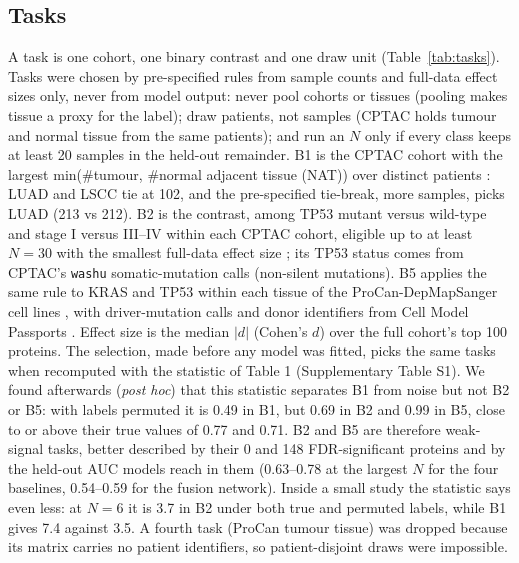 \documentclass[10pt,letterpaper]{article}
\begin{document}
\subsection{Tasks}\label{sec:tasks}
A task is one cohort, one binary contrast and one draw unit (Table~\ref{tab:tasks}). Tasks were chosen by
pre-specified rules from sample counts and full-data effect sizes only, never from model output: never pool
cohorts or tissues (pooling makes tissue a proxy for the label); draw patients, not samples (CPTAC holds
tumour and normal tissue from the same patients); and run an $N$ only if every class keeps at least 20
samples in the held-out remainder. B1 is the CPTAC cohort with the largest min(\#tumour, \#normal adjacent
tissue (NAT)) over distinct patients \citep{gillette2020luad,lindgren2021cptac}: LUAD and LSCC tie at 102, and
the pre-specified tie-break, more samples, picks LUAD (213 vs 212). B2 is the contrast, among TP53 mutant
versus wild-type and stage I versus III--IV within each CPTAC cohort, eligible up to at least $N = 30$ with the
smallest full-data effect size \citep{cao2021pdac}; its TP53 status comes from CPTAC's \texttt{washu}
somatic-mutation calls (non-silent mutations). B5 applies the same rule to KRAS and TP53 within each tissue of
the ProCan-DepMapSanger cell lines \citep{goncalves2022procan}, with driver-mutation calls and donor
identifiers from Cell Model Passports \citep{vandermeer2019cmp}. Effect size is the median $|d|$ (Cohen's $d$)
over the full cohort's top 100 proteins. The selection, made before any model was fitted, picks the same tasks when recomputed with the statistic of Table 1 (Supplementary Table S1). We found afterwards (\emph{post hoc}) that this
statistic separates B1 from noise but not B2 or B5: with labels permuted it is 0.49 in B1, but 0.69 in B2
and 0.99 in B5, close to or above their true values of 0.77 and 0.71. B2 and B5 are therefore weak-signal
tasks, better described by their 0 and 148 FDR-significant proteins and by the held-out AUC models reach in
them (0.63--0.78 at the largest $N$ for the four baselines, 0.54--0.59 for the fusion network). Inside a
small study the statistic says even less: at $N = 6$ it is 3.7 in B2 under both true and permuted labels,
while B1 gives 7.4 against 3.5. A fourth task (ProCan tumour tissue) was dropped because its matrix carries
no patient identifiers, so patient-disjoint draws were impossible.
\end{document}
